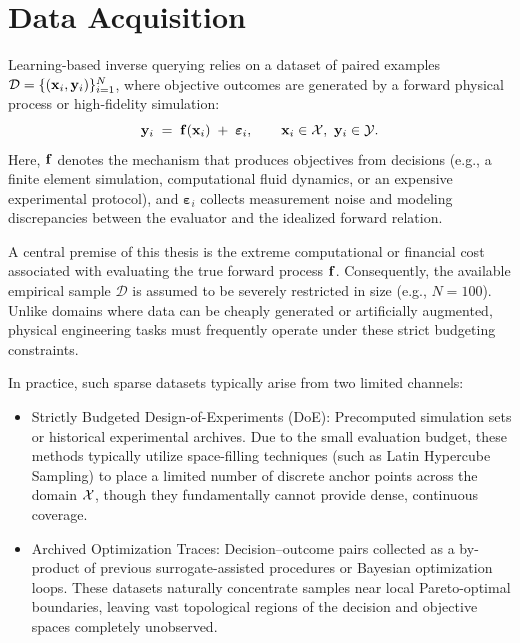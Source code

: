 \section{Data Acquisition}\label{sec:database}

Learning-based inverse querying relies on a dataset of paired examples
\(\mathcal{D}=\{(\mathbf{x}_i,\mathbf{y}_i)\}_{i=1}^{N}\), where objective outcomes are generated by a forward physical process or high-fidelity simulation:
\begin{equation}
  \mathbf{y}_i \;=\; \mathbf{f}(\mathbf{x}_i) \;+\; \boldsymbol{\varepsilon}_i,
  \qquad \mathbf{x}_i\in\mathcal{X},\ \mathbf{y}_i\in\mathcal{Y} .
  \label{eq:database_forward}
\end{equation}
Here, \(\mathbf{f}\) denotes the mechanism that produces objectives from decisions (e.g., a finite element simulation, computational fluid dynamics, or an expensive experimental protocol), and \(\boldsymbol{\varepsilon}_i\) collects measurement noise and modeling discrepancies between the evaluator and the idealized forward relation. 

A central premise of this thesis is the extreme computational or financial cost associated with evaluating the true forward process \(\mathbf{f}\). Consequently, the available empirical sample \(\mathcal{D}\) is assumed to be severely restricted in size (e.g., $N=100$). Unlike domains where data can be cheaply generated or artificially augmented, physical engineering tasks must frequently operate under these strict budgeting constraints.

In practice, such sparse datasets typically arise from two limited channels:
\begin{itemize}
  \item Strictly Budgeted Design-of-Experiments (DoE): Precomputed simulation sets or historical experimental archives. Due to the small evaluation budget, these methods typically utilize space-filling techniques (such as Latin Hypercube Sampling) to place a limited number of discrete anchor points across the domain \(\mathcal{X}\), though they fundamentally cannot provide dense, continuous coverage.
  \item Archived Optimization Traces: Decision--outcome pairs collected as a by-product of previous surrogate-assisted procedures or Bayesian optimization loops. These datasets naturally concentrate samples near local Pareto-optimal boundaries, leaving vast topological regions of the decision and objective spaces completely unobserved.
\end{itemize}

